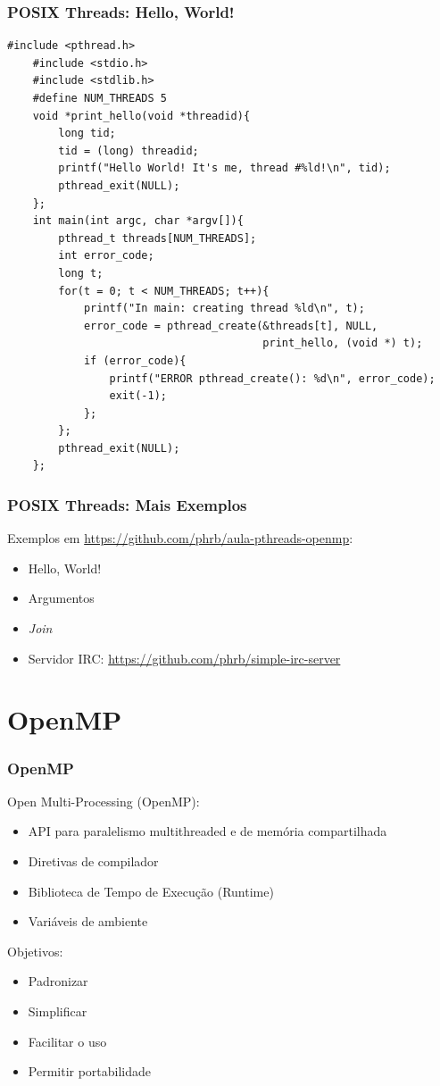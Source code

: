 \documentclass[10pt, compress]{beamer}
\begin{document}
\begin{frame}[fragile]
    \frametitle{POSIX Threads: Hello, World!}
    \begin{lstlisting}[basicstyle=\ttfamily\scriptsize]
    #include <pthread.h>
    #include <stdio.h>
    #include <stdlib.h>
    #define NUM_THREADS 5
    void *print_hello(void *threadid){
        long tid;
        tid = (long) threadid;
        printf("Hello World! It's me, thread #%ld!\n", tid);
        pthread_exit(NULL);
    };
    int main(int argc, char *argv[]){
        pthread_t threads[NUM_THREADS];
        int error_code;
        long t;
        for(t = 0; t < NUM_THREADS; t++){
            printf("In main: creating thread %ld\n", t);
            error_code = pthread_create(&threads[t], NULL,
                                        print_hello, (void *) t);
            if (error_code){
                printf("ERROR pthread_create(): %d\n", error_code);
                exit(-1);
            };
        };
        pthread_exit(NULL);
    };
    \end{lstlisting}
\end{frame}

\begin{frame}
    \frametitle{POSIX Threads: Mais Exemplos}
    Exemplos em \url{https://github.com/phrb/aula-pthreads-openmp}:
    \begin{itemize}
        \item Hello, World!
        \item Argumentos
        \item \textit{Join}
        \item Servidor IRC: \url{https://github.com/phrb/simple-irc-server}
    \end{itemize}
\end{frame}

\section{OpenMP}

\begin{frame}
    \frametitle{OpenMP}
    \alert{Open Multi-Processing} (OpenMP):
    \begin{itemize}
        \item API para paralelismo \alert{multithreaded} e de \alert{memória
            compartilhada}
        \item \alert{Diretivas de compilador}
        \item Biblioteca de \alert{Tempo de Execução} (\alert{Runtime})
        \item Variáveis de ambiente
    \end{itemize}

    \pause

    Objetivos:
    \begin{itemize}
        \item \alert{Padronizar}
        \item \alert{Simplificar}
        \item \alert{Facilitar o uso}
        \item \alert{Permitir portabilidade}
    \end{itemize}
\end{frame}
\end{document}

